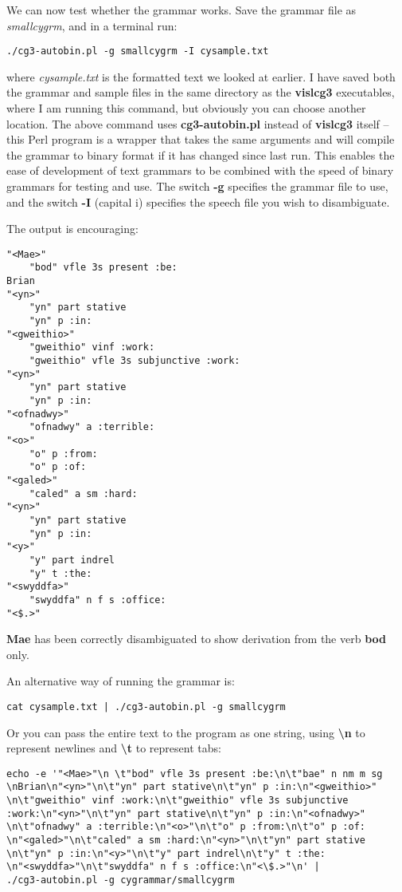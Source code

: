 \documentclass[a4paper,10pt]{article}
\begin{document}
We can now test whether the grammar works.  Save the grammar file as \textit{smallcygrm}, and in a terminal run:
\begin{Verbatim}[tabsize=4]
./cg3-autobin.pl -g smallcygrm -I cysample.txt
\end{Verbatim}
where \textit{cysample.txt} is the formatted text we looked at earlier. I have saved both the grammar and sample files in the same directory as the \textbf{vislcg3} executables, where I am running this command, but obviously you can choose another location.  The above command uses \textbf{cg3-autobin.pl} instead of \textbf{vislcg3} itself -- this Perl program is a wrapper that takes the same arguments and will compile the grammar to binary format if it has changed since last run. This enables the ease of development of text grammars to be combined with the speed of binary grammars for testing and use.  The switch \textbf{-g} specifies the grammar file to use, and the switch \textbf{-I} (capital i) specifies the speech file you wish to disambiguate.

The output is  encouraging:
\begin{Verbatim}[tabsize=4]
"<Mae>"
	"bod" vfle 3s present :be:
Brian
"<yn>"
	"yn" part stative
	"yn" p :in:
"<gweithio>"
	"gweithio" vinf :work:
	"gweithio" vfle 3s subjunctive :work:
"<yn>"
	"yn" part stative
	"yn" p :in:
"<ofnadwy>"
	"ofnadwy" a :terrible:
"<o>"
	"o" p :from:
	"o" p :of:
"<galed>"
	"caled" a sm :hard:
"<yn>"
	"yn" part stative
	"yn" p :in:
"<y>"
	"y" part indrel
	"y" t :the:
"<swyddfa>"
	"swyddfa" n f s :office:
"<$.>"
\end{Verbatim}
\textbf{Mae} has been correctly disambiguated to show derivation from the verb \textbf{bod} only.

An alternative way of running the grammar is:
\begin{Verbatim}[tabsize=4]
cat cysample.txt | ./cg3-autobin.pl -g smallcygrm
\end{Verbatim}

Or you can pass the entire text to the program as one string, using \textbf{\textbackslash n} to represent newlines and \textbf{\textbackslash t} to represent tabs:

\begin{BVerbatim}
echo -e '"<Mae>"\n \t"bod" vfle 3s present :be:\n\t"bae" n nm m sg
\nBrian\n"<yn>"\n\t"yn" part stative\n\t"yn" p :in:\n"<gweithio>"
\n\t"gweithio" vinf :work:\n\t"gweithio" vfle 3s subjunctive 
:work:\n"<yn>"\n\t"yn" part stative\n\t"yn" p :in:\n"<ofnadwy>"
\n\t"ofnadwy" a :terrible:\n"<o>"\n\t"o" p :from:\n\t"o" p :of:
\n"<galed>"\n\t"caled" a sm :hard:\n"<yn>"\n\t"yn" part stative
\n\t"yn" p :in:\n"<y>"\n\t"y" part indrel\n\t"y" t :the:
\n"<swyddfa>"\n\t"swyddfa" n f s :office:\n"<\$.>"\n' | 
./cg3-autobin.pl -g cygrammar/smallcygrm
\end{BVerbatim}
\end{document}
